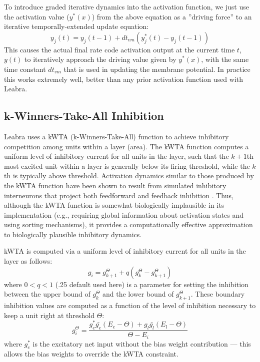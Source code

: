 To introduce graded iterative dynamics into the activation function, we just use the activation value ($y^*(x)$) from the above equation as a ''driving force'' to an iterative temporally-extended update equation:
\begin{equation}
  y_j(t) = y_j(t-1) + dt_{vm} \left(y_j^*(t) - y_j(t-1) \right)
 \label{eq.y_iter}
\end{equation}
This causes the actual final rate code activation output at the current time $t$, $y(t)$ to iteratively approach the driving value given by $y^*(x)$, with the same time constant $dt_{vm}$ that is used in updating the membrane potential.  In practice this works extremely well, better than any prior activation function used with Leabra.


\subsection{k-Winners-Take-All Inhibition}

Leabra uses a kWTA (k-Winners-Take-All) function to achieve inhibitory competition among units within a layer (area). The kWTA function computes a uniform level of inhibitory current for all units in the layer, such that the $k+1$th most excited unit within a layer is generally below its firing threshold, while the $k$th is typically above threshold. Activation dynamics similar to those produced by the kWTA function have been shown to result from simulated inhibitory interneurons that project both feedforward and feedback inhibition \cite{OReillyMunakata00}. Thus, although the kWTA function is somewhat biologically implausible in its implementation (e.g., requiring global information about activation states and using sorting mechanisms), it provides a computationally effective approximation to biologically plausible inhibitory dynamics.

kWTA is computed via a uniform level of inhibitory current for all units in the layer as follows:
\begin{equation}
 g_i = g^{\Theta}_{k+1} + q (g^{\Theta}_k - g^{\Theta}_{k+1})
 \label{eq.g_i}
\end{equation}
where $0<q<1$ (.25 default used here) is a parameter for setting the inhibition between the upper bound of $g^{\Theta}_k$ and the lower bound of $g^{\Theta}_{k+1}$. These boundary inhibition values are computed as a function of the level of inhibition necessary to keep a
unit right at threshold $\Theta$:
\begin{equation}
 g_i^{\Theta} = \frac{g^*_e \bar{g_e} (E_e - \Theta) +
  g_l \bar{g_l} (E_l - \Theta)}{\Theta - E_i}
 \label{eq.i_at_thr}
\end{equation}
where $g^*_e$ is the excitatory net input without the bias weight contribution --- this allows the bias weights to override the kWTA constraint.

